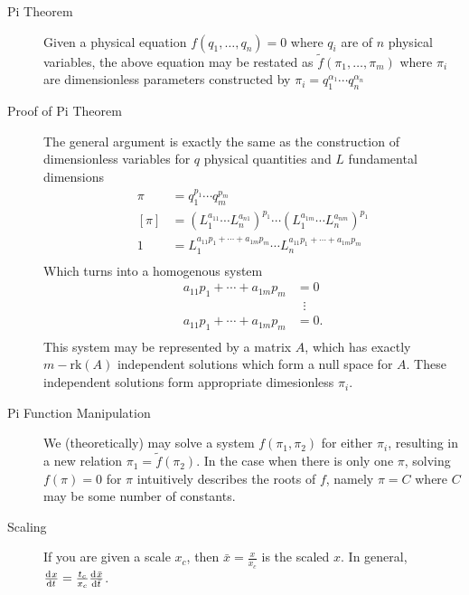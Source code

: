 \documentclass[8pt]{article}
\begin{document}

\begin{multicols}{2}
  \begin{description}
  \item[Pi Theorem] Given a physical equation $f(q_1,\ldots,q_n)=0$ where $q_i$
    are of $n$ physical variables, the above equation may be restated as
    $\tilde{f}(\pi_1,\ldots,\pi_m)$ where $\pi_i$ are dimensionless parameters
    constructed by $\pi_i=q_1^{\alpha_1}\cdots q_n^{\alpha_n}$
  \item[Proof of Pi Theorem] The general argument is exactly the same as the
    construction of dimensionless variables for $q$ physical quantities and $L$
    fundamental dimensions
    \begin{equation*}
        \begin{aligned}
          \pi &= q_1^{p_1}\cdots q_m^{p_m} \\
          [\pi] &= {(L_1^{a_{11}}\cdots L_n^{a_{n1}})}^{p_1}\cdots
          {(L_1^{a_{1m}}\cdots L_n^{a_{nm}})}^{p_1} \\
          1 &= L_1^{a_{11}p_1+\cdots+a_{1m}p_m}\cdots L_n^{a_{11}p_1+\cdots+a_{1m}p_m} \\
        \end{aligned}
    \end{equation*}
    Which turns into a homogenous system
    \begin{equation*}
      \begin{aligned}
        a_{11}p_1+\cdots+a_{1m}p_m &= 0 \\
        &\;\;\vdots \\
        a_{11}p_1+\cdots+a_{1m}p_m &= 0. \\
      \end{aligned}
    \end{equation*}
    This system may be represented by a matrix $A$, which has exactly
    $m-\text{rk}(A)$ independent solutions which form a null space for $A$.
    These independent solutions form appropriate dimesionless $\pi_i$.
  \item[Pi Function Manipulation] We (theoretically) may solve a system
    $f(\pi_1, \pi_2)$ for either $\pi_i$, resulting in a new relation
    $\pi_1=\tilde{f}(\pi_2)$. In the case when there is only one $\pi$, solving
    $f(\pi)=0$ for $\pi$ intuitively describes the roots of $f$, namely $\pi=C$
    where $C$ may be some number of constants.
  \item[Scaling] If you are given a scale $x_c$, then $\bar{x}=\frac{x}{x_c}$ is
    the scaled $x$. In general, $\frac{\mathrm{d}^{} {x}}{\mathrm{d}{t}^{}}=\frac{t_c}{x_c}\frac{\mathrm{d}^{} {\bar{x}}}{\mathrm{d}{\bar{t}}^{}}$.
  \end{description}
\end{multicols}
\end{document}
